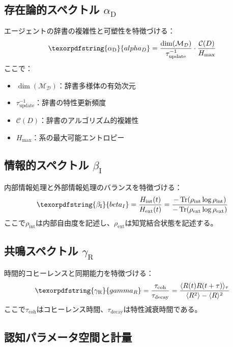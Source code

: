 \documentclass[11pt,a4paper]{article}
\DeclareMathOperator{\Tr}{Tr}
\DeclareRobustCommand{\alD}{\texorpdfstring{\ensuremath{\alpha_{\mathrm{D}}}}{alpha_D}}
\DeclareRobustCommand{\beI}{\texorpdfstring{\ensuremath{\beta_{\mathrm{I}}}}{beta_I}}
\DeclareRobustCommand{\gaR}{\texorpdfstring{\ensuremath{\gamma_{\mathrm{R}}}}{gamma_R}}
\newcommand{\Dict}{\mathcal{D}}
\newcommand{\Mdict}{\mathcal{M}_{\Dict}}
\begin{document}
	\subsection{存在論的スペクトル \alD}
	
	エージェントの辞書の複雑性と可塑性を特徴づける：
	\begin{equation}
		\label{eq:alphaD}
		\alD = \frac{\dim(\Mdict)}{\tau_{\mathrm{update}}^{-1}} \cdot \frac{\mathcal{C}(D)}{H_{\mathrm{max}}}
	\end{equation}
	ここで：
	\begin{itemize}
		\item \(\dim(\Mdict)\)：辞書多様体の有効次元
		\item \(\tau_{\mathrm{update}}^{-1}\)：辞書の特性更新頻度
		\item \(\mathcal{C}(D)\)：辞書のアルゴリズム的複雑性
		\item \(H_{\mathrm{max}}\)：系の最大可能エントロピー
	\end{itemize}
	
	\subsection{情報的スペクトル \beI}
	
	内部情報処理と外部情報処理のバランスを特徴づける：
	\begin{equation}
		\label{eq:betaI}
		\beI = \frac{H_{\mathrm{int}}(t)}{H_{\mathrm{ext}}(t)} = \frac{-\Tr(\rho_{\mathrm{int}}\log\rho_{\mathrm{int}})}{-\Tr(\rho_{\mathrm{ext}}\log\rho_{\mathrm{ext}})}
	\end{equation}
	ここで\(\rho_{\mathrm{int}}\)は内部自由度を記述し、\(\rho_{\mathrm{ext}}\)は知覚結合状態を記述する。
	
	\subsection{共鳴スペクトル \gaR}
	
	時間的コヒーレンスと同期能力を特徴づける：
	\begin{equation}
		\label{eq:gammaR}
		\gaR = \frac{\tau_{\mathrm{coh}}}{\tau_{\mathrm{decay}}} = \frac{\langle R(t)R(t+\tau)\rangle_\tau}{\langle R^2\rangle - \langle R\rangle^2}
	\end{equation}
	ここで\(\tau_{\mathrm{coh}}\)はコヒーレンス時間、\(\tau_{\mathrm{decay}}\)は特性減衰時間である。
	
	\subsection{認知パラメータ空間と計量}
	
\end{document}
